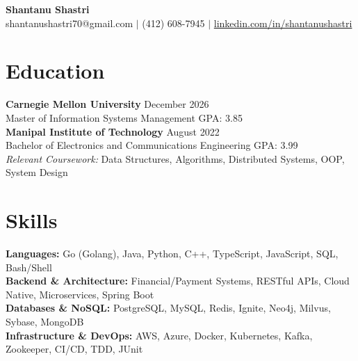 \documentclass[11pt,a4paper]{article}
\begin{document}
\begin{center}
    \Huge \textbf{Shantanu Shastri} \\
    \vspace{2pt}
    \small shantanushastri70@gmail.com $|$ (412) 608-7945 $|$ \href{https://linkedin.com/in/shantanushastri}{linkedin.com/in/shantanushastri}
\end{center}

\vspace{-5pt}
\section{Education}
\noindent
\textbf{Carnegie Mellon University} \hfill December 2026 \\
Master of Information Systems Management \hfill GPA: 3.85 \\
\textbf{Manipal Institute of Technology} \hfill August 2022 \\
Bachelor of Electronics and Communications Engineering \hfill GPA: 3.99 \\
\textit{Relevant Coursework:} Data Structures, Algorithms, Distributed Systems, OOP, System Design

\vspace{-5pt}
\section{Skills}
\noindent
\textbf{Languages:} Go (Golang), Java, Python, C++, TypeScript, JavaScript, SQL, Bash/Shell \\
\textbf{Backend \& Architecture:} Financial/Payment Systems, RESTful APIs, Cloud Native, Microservices, Spring Boot \\
\textbf{Databases \& NoSQL:} PostgreSQL, MySQL, Redis, Ignite, Neo4j, Milvus, Sybase, MongoDB \\
\textbf{Infrastructure \& DevOps:} AWS, Azure, Docker, Kubernetes, Kafka, Zookeeper, CI/CD, TDD, JUnit

\vspace{-5pt}
\end{document}
